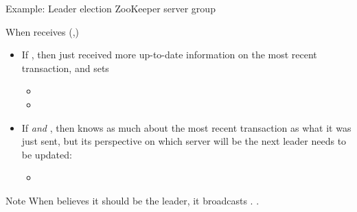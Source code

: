 \begin{slide}{Example: Leader election  ZooKeeper server group}
  \begin{block}{When  receives (,)}
    \begin{itemize}%

    \item If , then  just received more up-to-date
      information on the most recent transaction, and sets
      \begin{itemize}\firmlist
      \item {}
      \item {}
      \end{itemize}

    \item If  \emph{and} , then  knows as much about the most recent transaction as what it was just sent, but
      its perspective on which server will be the next leader needs to be updated:
      \begin{itemize}\firmlist
      \item {}
      \end{itemize}
    \end{itemize}
  \end{block}
  \begin{alertblock}{Note}
    When  believes it should be the leader, it broadcasts
    . .
  \end{alertblock}
\end{slide}
